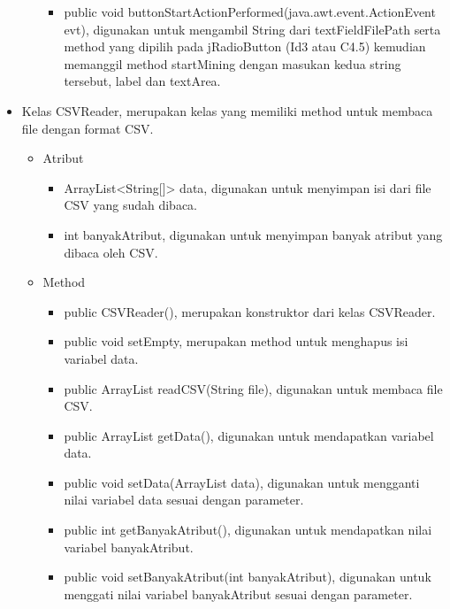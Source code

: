 \begin{itemize}
\begin{itemize}
\begin{itemize}
			\item public void buttonStartActionPerformed(java.awt.event.ActionEvent evt), digunakan untuk mengambil String dari textFieldFilePath serta method yang dipilih pada jRadioButton (Id3 atau C4.5) kemudian memanggil method startMining dengan masukan kedua string tersebut, label dan textArea.
		\end{itemize}
	\end{itemize}

	\item Kelas CSVReader, merupakan kelas yang memiliki method untuk membaca file dengan format CSV.
	\begin{itemize}
		\item Atribut
		\begin{itemize}
			\item ArrayList<String[]> data, digunakan untuk menyimpan isi dari file CSV yang sudah dibaca.
			\item int banyakAtribut, digunakan untuk menyimpan banyak atribut yang dibaca oleh CSV.
		\end{itemize}
		\item Method
		\begin{itemize}
			\item public CSVReader(), merupakan konstruktor dari kelas CSVReader.
			\item public void setEmpty, merupakan method untuk menghapus isi variabel data.
			\item public ArrayList readCSV(String file), digunakan untuk membaca file CSV.
			\item public ArrayList getData(), digunakan untuk mendapatkan variabel data.
			\item public void setData(ArrayList data), digunakan untuk mengganti nilai variabel data sesuai dengan parameter.
			\item public int getBanyakAtribut(), digunakan untuk mendapatkan nilai variabel banyakAtribut.
			\item public void setBanyakAtribut(int banyakAtribut), digunakan untuk menggati nilai variabel banyakAtribut sesuai dengan parameter.
		\end{itemize}
	\end{itemize}


\end{itemize}
